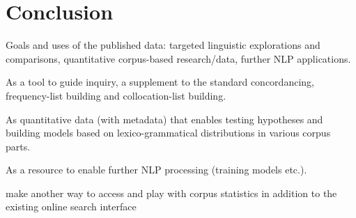 \documentclass[12pt]{article}
\begin{document}


\section{Conclusion}

Goals and uses of the published data: targeted linguistic explorations
and comparisons, quantitative corpus-based research/data, further NLP
applications. 

As a tool to guide inquiry, a supplement to the standard
concordancing, frequency-list building and collocation-list building.

As quantitative data (with metadata) that enables testing hypotheses
and building models based on lexico-grammatical distributions in
various corpus parts. 

As a resource to enable further NLP processing (training models
etc.).

make another way to access and play with corpus statistics in addition
to the existing online search interface
\end{document}
